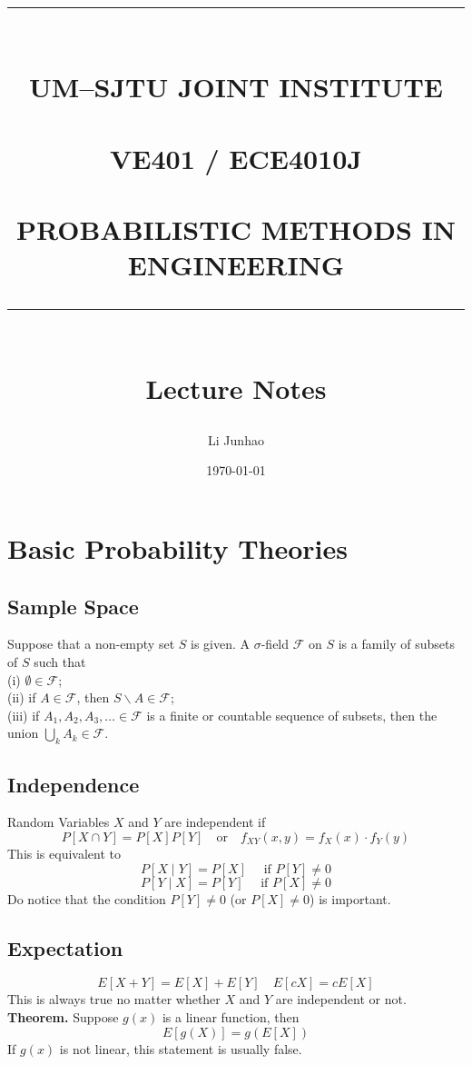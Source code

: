 \documentclass[a4paper,12pt]{article}
\title{ \rule{\textwidth}{0.3mm} \\ \textbf{UM–SJTU JOINT INSTITUTE \\ ~\\ VE401 / ECE4010J \\ ~\\ PROBABILISTIC METHODS IN ENGINEERING} \\ \rule{\textwidth}{0.3mm} 
\\ [30 mm]
\Large{Lecture Notes} \\
[15 mm]
} %
\author{Li Junhao} %
\date{\today} %
\begin{document}
\scshape

\maketitle

    \thispagestyle{empty}
    
    
    \newpage
    
    
    \tableofcontents
    
    
    \newpage
    
    
    \setcounter{page}{1}
    \upshape
    \section{Basic Probability Theories}
    \subsection{Sample Space}
    Suppose that a non-empty set $S$ is given. A $\sigma$-field $\mathcal{F} $ on $S$ is a family of subsets of $S$ such that\\
(i) $\emptyset \in \mathcal{F} $;\\
(ii) if $A \in \mathcal{F} $, then $S \backslash A \in \mathcal{F} $;\\
(iii) if $A_1, A_2, A_3, \ldots \in \mathcal{F} $ is a finite or countable sequence of subsets, then the union $\bigcup_k A_k \in \mathcal{F} $.
    \subsection{Independence}
    Random Variables $X$ and $Y$ are independent if 
    $$P[X\cap Y] = P[X]P[Y] \quad \text{or} \quad f_{XY}(x,y)= f_X(x)\cdot f_Y(y)$$
    This is equivalent to 
    $$
    P[X\mid Y] = P[X] \quad \text{ if } P[Y] \neq 0
    $$
    $$
    P[Y\mid X] = P[Y] \quad \text{ if } P[X] \neq 0
    $$
    Do notice that the condition $P[Y] \neq 0$ (or $P[X] \neq 0$) is important.
    \subsection{Expectation}
    $$E[X+Y] = E[X] + E[Y] \quad E[cX] = cE[X]$$
    This is always true no matter whether $X$ and $Y$ are independent or not.\\
    \textbf{Theorem.} Suppose $g(x)$ is a linear function, then
    $$
    E[g(X)]=g(E[X])
    $$
    If $g(x)$ is not linear, this statement is usually false.
\end{document}
